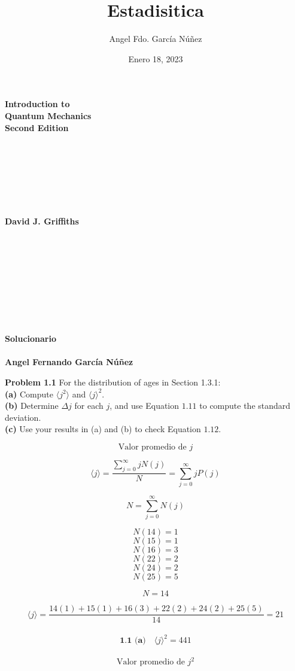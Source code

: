 \documentclass[10pt,a4papper]{article}
\author{Angel Fdo. García Núñez}
\date{Enero 18, 2023}
\title{Estadisitica}
\begin{document}
\Huge
\textbf{Introduction to}\\
\textbf{Quantum Mechanics}\\

\large
\textbf{Second Edition}\\\\\\\\\\\\\\\\

\textbf{David J. Griffiths}\\\\\\\\\\\\\\\\\\\\

\Large
\textbf{Solucionario}\\\\
\large
\textbf{Angel Fernando García Núñez}

\Large
\newpage
\textbf{Problem 1.1} For the distribution of ages in Section 1.3.1:\\

\textbf{(a)} Compute $\langle j^2\rangle$ and $\langle j\rangle^2$.\\
\textbf{(b)} Determine $\Delta j$ for each $j$, and use Equation $1.11$ to compute the standard
deviation.\\
\textbf{(c)} Use your results in (a) and (b) to check Equation $1.12$.

\newpage
\[\text{Valor promedio de }j\]

\[\langle j\rangle=\frac{\sum_{j=0}^\infty jN(j)}{N}=\sum_{j=0}^\infty jP(j)\]

\[N=\sum_{j=0}^\infty N(j)\]

\[N(14)=1\]
\[N(15)=1\]
\[N(16)=3\]
\[N(22)=2\]
\[N(24)=2\]
\[N(25)=5\]

\[N=14\]

\[\langle j\rangle=\frac{14(1)+15(1)+16(3)+22(2)+24(2)+25(5)}{14}=21\]\\

\[\boxed{\textbf{1.1 (a)}\quad\langle j\rangle^2=441}\]\\

\[\text{Valor promedio de }j^2\]
\end{document}
